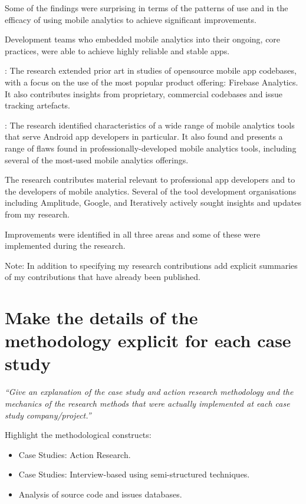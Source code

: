 Some of the findings were surprising in terms of the patterns of use and in the efficacy of using mobile analytics to achieve significant improvements.

Development teams who embedded mobile analytics into their ongoing, core practices, were able to achieve highly reliable and stable apps. 

: 
The research extended prior art in studies of opensource mobile app codebases, with a focus on the use of the most popular product offering: Firebase Analytics. It also contributes insights from proprietary, commercial codebases and issue tracking artefacts.

:
The research identified characteristics of a wide range of mobile analytics tools that serve Android app developers in particular. It also found and  presents a range of flaws found in professionally-developed mobile analytics tools, including several of the most-used mobile analytics offerings.

The research contributes material relevant to professional app developers and to the developers of mobile analytics. Several of the tool development organisations including Amplitude, Google, and Iteratively actively sought insights and updates from my research.

Improvements were identified in all three areas and some of these were implemented during the research. 

Note: In addition to specifying my research contributions add explicit summaries of my contributions that have already been published.


\section{Make the details of the methodology explicit for each case study}
\emph{``Give an explanation of the case study and action research methodology and the mechanics of the research methods that were actually implemented at each case study company/project.''}

Highlight the methodological constructs:
\begin{itemize}
    \item Case Studies: Action Research.
    \item Case Studies: Interview-based using semi-structured techniques.
    \item Analysis of source code and issues databases.
\end{itemize}

